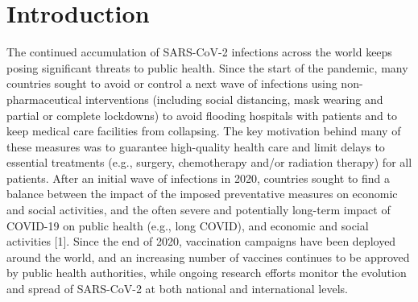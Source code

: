 \onehalfspacing

\section{Introduction}
The continued accumulation of SARS-CoV-2 infections across the world keeps posing significant threats to public health. Since the start of the pandemic, many countries sought to avoid or control a next wave of infections using non-pharmaceutical interventions (including social distancing, mask wearing and partial or complete lockdowns) to avoid flooding hospitals with patients and to keep medical care facilities from collapsing. The key motivation behind many of these measures was to guarantee high-quality health care and limit delays to essential treatments (e.g., surgery, chemotherapy and/or radiation therapy) for all patients. After an initial wave of infections in 2020, countries sought to find a balance between the impact of the imposed preventative measures on economic and social activities, and the often severe and potentially long-term impact of COVID-19 on public health (e.g., long COVID), and economic and social activities [1]. Since the end of 2020, vaccination campaigns have been deployed around the world, and an increasing number of vaccines continues to be approved by public health authorities, while ongoing research efforts monitor the evolution and spread of SARS-CoV-2 at both national and international levels.


